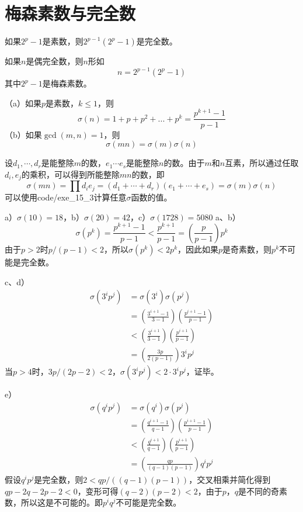 \chapter{梅森素数与完全数}
\begin{theorem}[欧几里得完全数公式]
如果$2^p-1$是素数，则$2^{p-1}(2^p-1)$是完全数。
\end{theorem}
\begin{theorem}[欧拉完全数定理]
如果$n$是偶完全数，则$n$形如
\[n=2^{p-1}(2^p-1)\]
其中$2^p-1$是梅森素数。
\end{theorem}
\begin{theorem}
（a）如果$p$是素数，$k\le1$，则
\[\sigma(n)=1+p+p^2+...+p^k=\frac{p^{k+1}-1}{p-1}\]
（b）如果$\gcd(m,n)=1$，则
\[\sigma(mn)=\sigma(m)\sigma(n)\]
\end{theorem}
%
\exercise 设$d_1,\cdots,d_r$是能整除$m$的数，$e_1\cdots e_s$是能整除$n$的数。由于$m$和$n$互素，所以通过任取$d_i,e_j$的乘积，可以得到所能整除$mn$的数，即
\[\sigma(mn)=\prod d_ie_j=(d_1+\cdots+d_r)(e_1+\cdots+e_s)=\sigma(m)\sigma(n)\]
%
\exercise 可以使用code/exe\_15\_3计算任意$\sigma$函数的值。\par
a）$\sigma(10)=18$，b）$\sigma(20)=42$，c）$\sigma(1728)=5080$
%
\exercise a、b）
\[\sigma(p^k)=\frac{p^{k+1}-1}{p-1}<\frac{p^{k+1}}{p-1}=\left(\frac{p}{p-1}\right)p^k\]
由于$p>2$时$p/(p-1)<2$，所以$\sigma(p^k)<2p^k$，因此如果$p$是奇素数，则$p^k$不可能是完全数。\par
c、d）
\begin{align*}
\sigma(3^ip^j)&=\sigma(3^i)\sigma(p^j) \\
&=\left(\frac{3^{i+1}-1}{3-1}\right)\left(\frac{p^{i+1}-1}{p-1}\right) \\
&<\left(\frac{3^{i+1}}{3-1}\right)\left(\frac{p^{i+1}}{p-1}\right) \\
&=\left(\frac{3p}{2(p-1)}\right)3^ip^j
\end{align*}
当$p>4$时，$3p/(2p-2)<2$，$\sigma(3^ip^j)<2\cdot3^ip^j$，证毕。\par
e）
\begin{align*}
\sigma(q^ip^j)&=\sigma(q^i)\sigma(p^j) \\
&=\left(\frac{q^{i+1}-1}{q-1}\right)\left(\frac{p^{i+1}-1}{p-1}\right) \\
&<\left(\frac{q^{i+1}}{q-1}\right)\left(\frac{p^{i+1}}{p-1}\right) \\
&=\left(\frac{qp}{(q-1)(p-1)}\right)q^ip^j
\end{align*}
假设$q^ip^j$是完全数，则$2<qp/((q-1)(p-1))$，交叉相乘并简化得到$qp-2q-2p-2<0$，变形可得$(q-2)(p-2)<2$，由于$p$，$q$是不同的奇素数，所以这是不可能的。即$p^iq^j$不可能是完全数。

